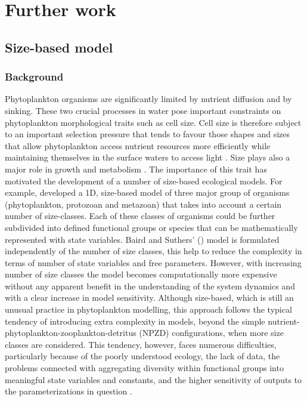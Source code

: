 \chapter {Further work}

\section{Size-based model}

\subsection{Background}

Phytoplankton organisms are significantly limited by nutrient diffusion and by sinking. These two crucial processes in water pose important constraints on phytoplankton morphological traits such as cell size. Cell size is therefore subject to an important selection pressure that tends to favour those shapes and sizes that allow phytoplankton access nutrient resources more efficiently while maintaining themselves in the surface waters to access light \citep{Litchman2008}. Size plays also a major role in growth and metabolism \citep{Finkel2009a}. The importance of this trait has motivated the development of a number of size-based ecological models. For example, \citet{Baird2007} developed a 1D, size-based model of three major group of organisms (phytoplankton, protozoan and metazoan) that takes into account a certain number of size-classes. Each of these classes of organisms could be further subdivided into defined functional groups or species that can be mathematically represented with state variables. Baird and Suthers' (\citeyear{Baird2007}) model is formulated independently of the number of size classes, this help to reduce the complexity in terms of number of state variables and free parameters. However, with increasing number of size classes the model becomes computationally more expensive without any apparent benefit in the understanding of the system dynamics and with a clear increase in model sensitivity. Although size-based, which is still an unusual practice in phytoplankton modelling, this approach follows the typical tendency of introducing extra complexity in models, beyond the simple nutrient-phytoplankton-zooplankton-detritus (NPZD) configurations, when more size classes are considered. This tendency, however, faces numerous difficulties, particularly because of the poorly understood ecology, the lack of data, the problems connected with aggregating diversity within functional groups into meaningful state variables and constants, and the higher sensitivity of outputs to the parameterizations in question \citep{Anderson2005}.

